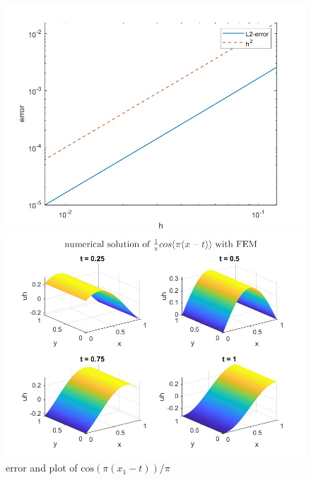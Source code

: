 \documentclass{article}
\begin{document}
\begin{figure}[!h]
	\begin{minipage}[c]{0.5\linewidth}
		\includegraphics[width=\linewidth]{E3error.jpg}
	\end{minipage}
	\begin{minipage}[c]{0.5\linewidth}
		\includegraphics[width=\linewidth]{E3NumSol.jpg}
	\end{minipage}
	\caption{error and plot of $\text{cos}(\pi(x_1-t))/\pi$ }
	\label{fig:E3}
\end{figure}
\end{document}
